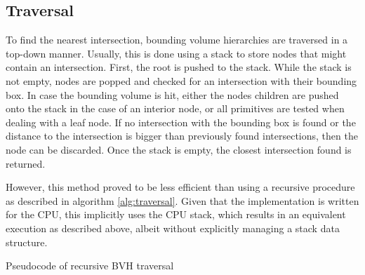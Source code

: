 \subsection{Traversal}
\label{traversal}
To find the nearest intersection, bounding volume hierarchies are traversed in a top-down manner. Usually, this is done using a stack\cite{meister21survey} to store nodes that might contain an intersection. First, the root is pushed to the stack. While the stack is not empty, nodes are popped and checked for an intersection with their bounding box. In case the bounding volume is hit, either the nodes children are pushed onto the stack in the case of an interior node, or all primitives are tested when dealing with a leaf node. If no intersection with the bounding box is found or the distance to the intersection is bigger than previously found intersections, then the node can be discarded. Once the stack is empty, the closest intersection found is returned.

However, this method proved to be less efficient than using a recursive procedure as described in algorithm \ref{alg:traversal}. Given that the implementation is written for the CPU, this implicitly uses the CPU stack, which results in an equivalent execution as described above, albeit without explicitly managing a stack data structure.
\begin{algorithm}
\caption{Pseudocode of recursive BVH traversal}
\label{alg:traversal}
    
    \;
    \;
\end{algorithm}
\cleardoublepage